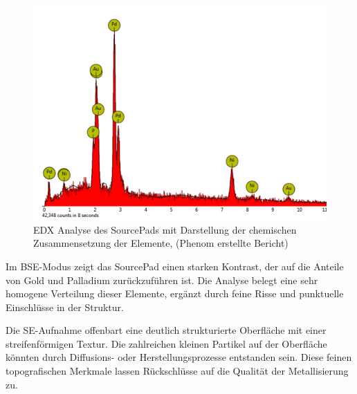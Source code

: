 \begin{figure}[H]
\begin{minipage}{.5\textwidth}
          \label{REM-Aufnahme(SE Komposit, 4000x) des SourcePads mit Punktanalyse}
        \end{minipage}
        
        \end{figure}
        \begin{figure}[H]
            \centering
            \includegraphics[scale=0.95]{Bilder/SourcePad}
            \caption{EDX Analyse des SourcePads mit Darstellung der chemischen Zusammensetzung der Elemente, (Phenom erstellte Bericht)}
            
            \vspace{0.2cm}
            \label{Abb.2: EDX Analyse des SourcePads}
        \end{figure}
        Im BSE-Modus zeigt das SourcePad einen starken Kontrast, der auf die Anteile von Gold und Palladium zurückzuführen ist. Die Analyse belegt eine sehr homogene Verteilung dieser Elemente, ergänzt durch feine Risse und punktuelle Einschlüsse in der Struktur.

        Die SE-Aufnahme offenbart eine deutlich strukturierte Oberfläche mit einer streifenförmigen Textur. Die zahlreichen kleinen Partikel auf der Oberfläche könnten durch Diffusions- oder Herstellungsprozesse entstanden sein. Diese feinen topografischen Merkmale lassen Rückschlüsse auf die Qualität der Metallisierung zu.

